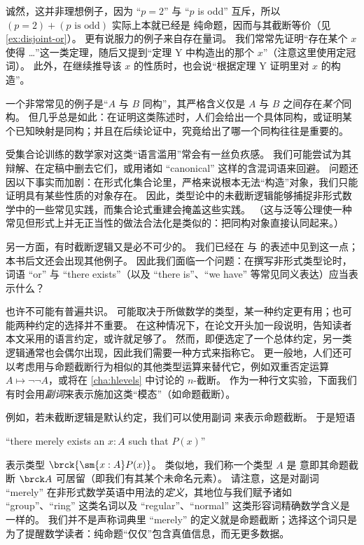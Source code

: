 诚然，这并非理想例子，因为 ``$p=2$'' 与 ``$p$ is odd'' 互斥，所以 $(p=2)+(p\text{ is odd})$ 实际上本就已经是 纯命题，因而与其截断等价（见 \cref{ex:disjoint-or}）。
更有说服力的例子来自存在量词。
我们常常先证明“存在某个 $x$ 使得 \dots”这一类定理，随后又提到“定理 Y 中构造出的那个 $x$”（注意这里使用定冠词）。
此外，在继续推导该 $x$ 的性质时，也会说“根据定理 Y 证明里对 $x$ 的构造”。

一个非常常见的例子是“$A$ 与 $B$ 同构”，其严格含义仅是 $A$ 与 $B$ 之间存在\emph{某个}同构。
但几乎总是如此：在证明这类陈述时，人们会给出一个具体同构，或证明某个已知映射是同构；并且在后续论证中，究竟给出了哪一个同构往往是重要的。

受集合论训练的数学家对这类“语言滥用”常会有一丝负疚感。
我们可能尝试为其辩解、在定稿中删去它们，或用诸如 ``canonical'' 这样的含混词语来回避。
问题还因以下事实而加剧：在形式化集合论里，严格来说根本无法“构造”对象，我们只能证明具有某些性质的对象存在。
因此，类型论中的未截断逻辑能够捕捉非形式数学中的一些常见实践，而集合论式重建会掩盖这些实践。
（这与泛等公理使一种常见但形式上并无正当性的做法合法化是类似的：把同构对象直接认同起来。）

另一方面，有时截断逻辑又是必不可少的。
我们已经在 \LEM{} 与 \choice{} 的表述中见到这一点；本书后文还会出现其他例子。
因此我们面临一个问题：在撰写非形式类型论时，词语 ``or'' 与 ``there exists''（以及 ``there is''、``we have'' 等常见同义表达）应当表示什么？

也许不可能有普遍共识。
可能取决于所做数学的类型，某一种约定更有用；也可能两种约定的选择并不重要。
在这种情况下，在论文开头加一段说明，告知读者本文采用的语言约定，或许就足够了。
然而，即便选定了一个总体约定，另一类逻辑通常也会偶尔出现，因此我们需要一种方式来指称它。
更一般地，人们还可以考虑用与命题截断行为相似的其他类型运算来替代它，例如双重否定运算 $A\mapsto \neg\neg A$，或将在 \cref{cha:hlevels} 中讨论的 $n$-截断。
作为一种行文实验，下面我们有时会用\emph{副词}来表示施加这类“模态”（如命题截断）。

例如，若未截断逻辑是默认约定，我们可以使用副词 
%
来表示命题截断。
于是短语
\begin{center}
  ``there merely exists an $x:A$ such that $P(x)$''
\end{center}
表示类型 $\brck{\sm{x:A} P(x)}$。
类似地，我们称一个类型 $A$ 是 
%
%
意即其命题截断 $\brck A$ 可居留（即我们有其某个未命名元素）。
请注意，这是对副词 ``merely'' 在非形式数学英语中用法的\emph{定义}，其地位与我们赋予诸如 ``group''、``ring'' 这类名词以及 ``regular''、``normal'' 这类形容词精确数学含义是一样的。
我们并不是声称词典里 ``merely'' 的定义就是命题截断；选择这个词只是为了提醒数学读者：纯命题“仅仅”包含真值信息，而无更多数据。

